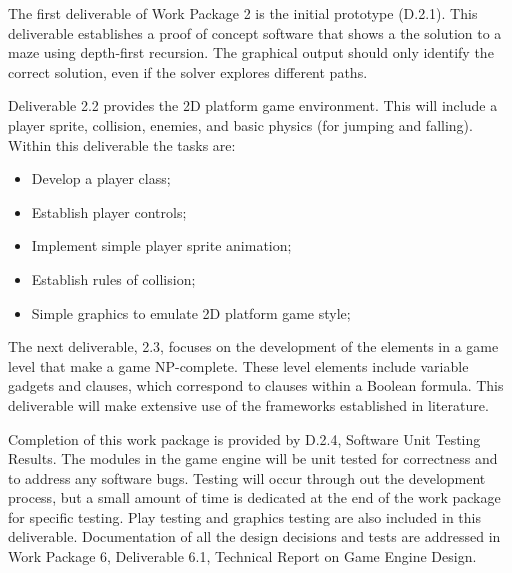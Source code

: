 \documentclass[a4paper]{article}
\begin{document}
The first deliverable of Work Package 2 is the initial prototype (D.2.1). This deliverable
establishes a proof of concept software that shows a the solution to a maze using depth-first
recursion. The graphical output should only identify the correct solution, even if the solver
explores different paths.

Deliverable 2.2 provides the 2D platform game environment. This will include a player sprite,
collision, enemies, and basic physics (for jumping and falling). Within this deliverable the tasks are:

\begin{itemize}

  \item Develop a player class;
  \item Establish player controls;
  \item Implement simple player sprite animation;
  \item Establish rules of collision;
  \item Simple graphics to emulate 2D platform game style;

\end{itemize}

The next deliverable, 2.3, focuses on the development of the elements in a game level that make a
game NP-complete. These level elements include variable gadgets and clauses, which correspond to
clauses within a Boolean formula. This deliverable will make extensive use of the frameworks
established in literature.

Completion of this work package is provided by D.2.4, Software Unit Testing Results. The modules in
the game engine will be unit tested for correctness and to address any software bugs. Testing will
occur through out the development process, but a small amount of time is dedicated at the end of the
work package for specific testing. Play testing and graphics testing are also included in this
deliverable.  Documentation of all the design decisions and tests are addressed in Work Package 6,
Deliverable 6.1, Technical Report on Game Engine Design.


\end{document}
